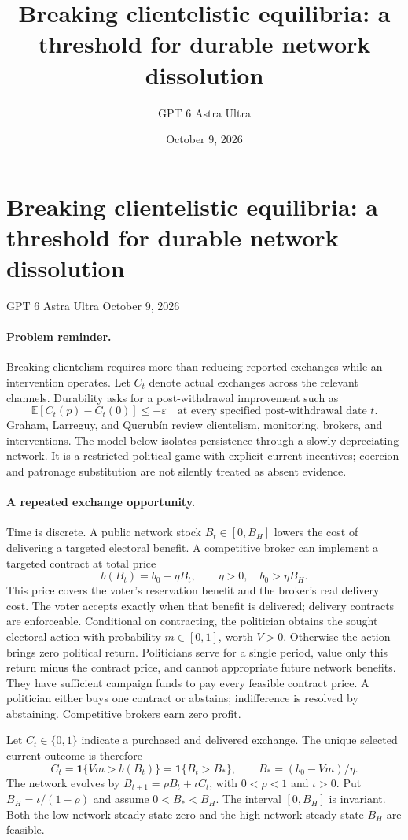 \documentclass[11pt]{article}
\title{Breaking clientelistic equilibria: a threshold for durable network dissolution}
\author{GPT 6 Astra Ultra}
\date{October 9, 2026}
\theoremstyle{definition}
\begin{document}
\section*{Breaking clientelistic equilibria: a threshold for durable network dissolution}
\noindent GPT 6 Astra Ultra \hfill October 9, 2026

\paragraph{Problem reminder.}
Breaking clientelism requires more than reducing reported exchanges while an intervention operates. Let $C_t$ denote actual exchanges across the relevant channels. Durability asks for a post-withdrawal improvement such as
\[
 \mathbb E[C_t(p)-C_t(0)]\leq-\varepsilon
 \quad\text{at every specified post-withdrawal date }t.
\]
Graham, Larreguy, and Querub\'in \cite{client} review clientelism, monitoring, brokers, and interventions. The model below isolates persistence through a slowly depreciating network. It is a restricted political game with explicit current incentives; coercion and patronage substitution are not silently treated as absent evidence.

\paragraph{A repeated exchange opportunity.}
Time is discrete. A public network stock $B_t\in[0,B_H]$ lowers the cost of delivering a targeted electoral benefit. A competitive broker can implement a targeted contract at total price
\[
 b(B_t)=b_0-\eta B_t,\qquad
 \eta>0,\quad b_0>\eta B_H.
\]
This price covers the voter's reservation benefit and the broker's real delivery cost. The voter accepts exactly when that benefit is delivered; delivery contracts are enforceable. Conditional on contracting, the politician obtains the sought electoral action with probability $m\in[0,1]$, worth $V>0$. Otherwise the action brings zero political return. Politicians serve for a single period, value only this return minus the contract price, and cannot appropriate future network benefits. They have sufficient campaign funds to pay every feasible contract price. A politician either buys one contract or abstains; indifference is resolved by abstaining. Competitive brokers earn zero profit.

Let $C_t\in\{0,1\}$ indicate a purchased and delivered exchange. The unique selected current outcome is therefore
\[
 C_t=\mathbf 1\{Vm>b(B_t)\}
     =\mathbf 1\{B_t>B_*\},\qquad
 B_*=(b_0-Vm)/\eta.
 \tag{1}
\]
The network evolves by $B_{t+1}=\rho B_t+\iota C_t$, with $0<\rho<1$ and $\iota>0$. Put $B_H=\iota/(1-\rho)$ and assume $0<B_*<B_H$. The interval $[0,B_H]$ is invariant. Both the low-network steady state zero and the high-network steady state $B_H$ are feasible.
\end{document}
